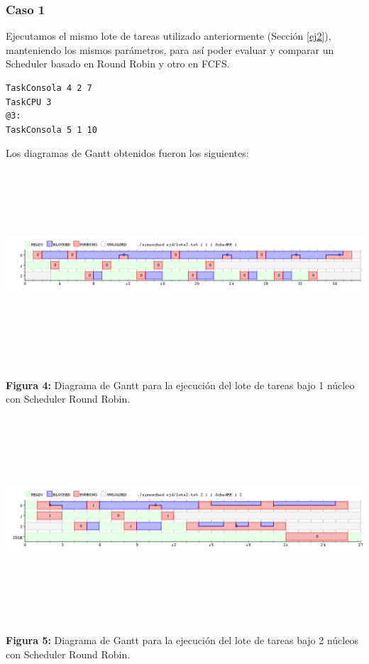 \documentclass[a4paper]{article}
\begin{document}
\subsubsection*{Caso 1}

Ejecutamos el mismo lote de tareas utilizado anteriormente (Secci\'on \ref{ej2}), manteniendo los mismos par\'ametros, para as\'i poder evaluar y comparar un Scheduler basado en Round Robin y otro en FCFS. 

	\begin{codesnippet}
	\begin{verbatim}
TaskConsola 4 2 7
TaskCPU 3
@3:
TaskConsola 5 1 10
	\end{verbatim}
	\end{codesnippet}

Los diagramas de Gantt obtenidos fueron los siguientes:\\


 \includegraphics[width=\textwidth,height=3.0in,keepaspectratio]{imagenes/ej4/1core.png} \newline
\begin {flushleft}
\textbf{Figura 4:} Diagrama de Gantt para la ejecuci\'on del lote de tareas bajo 1 n\'ucleo con Scheduler Round Robin.
\end{flushleft}

  \includegraphics[width=\textwidth,height=3.0in,keepaspectratio]{imagenes/ej4/2core.png} \newline
\begin {flushleft}
\textbf{Figura 5:} Diagrama de Gantt para la ejecuci\'on del lote de tareas bajo 2 n\'ucleos con Scheduler Round Robin.
\end{flushleft}
\end{document}
